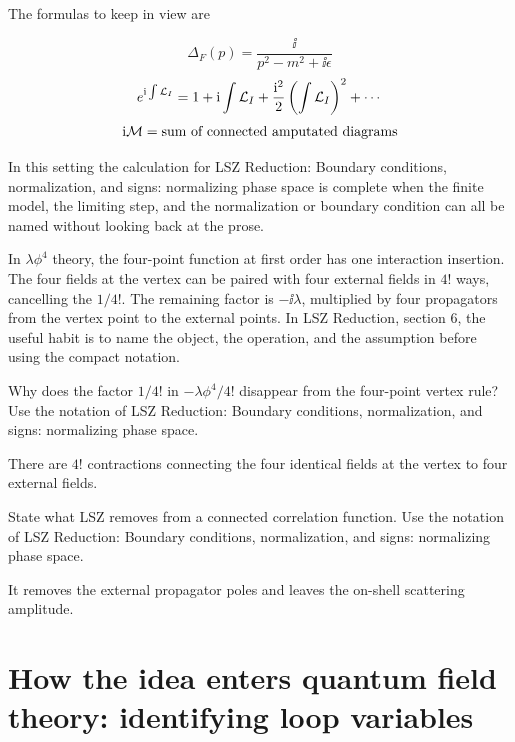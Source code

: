 The formulas to keep in view are

\[
  \Delta_F(p)=\frac{\ii}{p^2-m^2+\ii\epsilon}
\]
\[
  e^{\mathrm i\int\mathcal L_I}=1+\mathrm i\int\mathcal L_I+\frac{\mathrm i^2}{2}\left(\int\mathcal L_I\right)^2+\cdots
\]
\[
  \mathrm i\mathcal M=\hbox{sum of connected amputated diagrams}
\]

In this setting the calculation for LSZ Reduction: Boundary conditions, normalization, and signs: normalizing phase space is complete when the finite model, the limiting step, and the normalization or boundary condition can all be named without looking back at the prose.




\begin{example}
In \(\lambda\phi^4\) theory, the four-point function at first order has one interaction insertion.  The four fields at the vertex can be paired with four external fields in \(4!\) ways, cancelling the \(1/4!\).  The remaining factor is \(-\ii\lambda\), multiplied by four propagators from the vertex point to the external points.  In LSZ Reduction, section 6, the useful habit is to name the object, the operation, and the assumption before using the compact notation.
\end{example}



\begin{exercise}
Why does the factor \(1/4!\) in \(-\lambda\phi^4/4!\) disappear from the four-point vertex rule?  Use the notation of LSZ Reduction: Boundary conditions, normalization, and signs: normalizing phase space.
\begin{answer}
There are \(4!\) contractions connecting the four identical fields at the vertex to four external fields.
\end{answer}
\end{exercise}

\begin{exercise}
State what LSZ removes from a connected correlation function.  Use the notation of LSZ Reduction: Boundary conditions, normalization, and signs: normalizing phase space.
\begin{answer}
It removes the external propagator poles and leaves the on-shell scattering amplitude.
\end{answer}
\end{exercise}



\section{How the idea enters quantum field theory: identifying loop variables}

